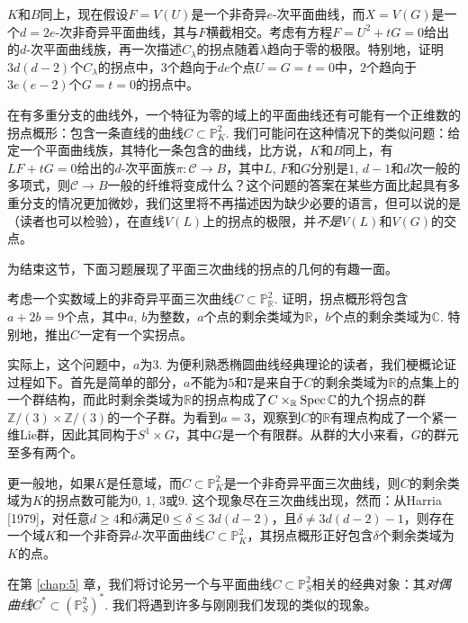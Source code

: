 \begin{exe}\label{exe:4.12}
	$K$和$B$同上，现在假设$F=V(U)$是一个非奇异$e$-次平面曲线，而$X=V(G)$是一个$d=2e$-次非奇异平面曲线，其与$F$横截相交。考虑有方程$F=U^2+tG=0$给出的$d$-次平面曲线族，再一次描述$C_\lambda$的拐点随着$\lambda$趋向于零的极限。特别地，证明$3d(d-2)$个$C_\lambda$的拐点中，$3$个趋向于$de$个点$U=G=t=0$中，$2$个趋向于$3e(e-2)$个$G=t=0$的拐点中。
\end{exe}

在有多重分支的曲线外，一个特征为零的域上的平面曲线还有可能有一个正维数的拐点概形：包含一条直线的曲线$C\subset \mathbb P_K^2$. 我们可能问在这种情况下的类似问题：给定一个平面曲线族，其特化一条包含的曲线，比方说，$K$和$B$同上，有$LF+tG=0$给出的$d$-次平面族$\pi:\mathscr C\to B$，其中$L$, $F$和$G$分别是$1$, $d-1$和$d$次一般的多项式，则$\mathscr C\to B$一般的纤维将变成什么？这个问题的答案在某些方面比起具有多重分支的情况更加微妙，我们这里将不再描述因为缺少必要的语言，但可以说的是（读者也可以检验），在直线$V(L)$上的拐点的极限，并\textit{不是}$V(L)$和$V(G)$的交点。

为结束这节，下面习题展现了平面三次曲线的拐点的几何的有趣一面。

\begin{exe}\label{exe:4.13}
	考虑一个实数域上的非奇异平面三次曲线$C\subset \mathbb P_{\mathbb R}^2$. 证明，拐点概形将包含$a+2b=9$个点，其中$a$, $b$为整数，$a$个点的剩余类域为$\mathbb R$，$b$个点的剩余类域为$\mathbb C$. 特别地，推出$C$一定有一个实拐点。
\end{exe}

实际上，这个问题中，$a$为$3$. 为便利熟悉椭圆曲线经典理论的读者，我们梗概论证过程如下。首先是简单的部分，$a$不能为$5$和$7$是来自于$C$的剩余类域为$\mathbb R$的点集上的一个群结构，而此时剩余类域为$\mathbb R$的拐点构成了$C\times_{\mathbb R}\operatorname{Spec} \mathbb C$的九个拐点的群$\mathbb Z/(3)\times \mathbb Z/(3)$的一个子群。为看到$a=3$，观察到$C$的$\mathbb R$有理点构成了一个紧一维Lie群，因此其同构于$S^1\times G$，其中$G$是一个有限群。从群的大小来看，$G$的群元至多有两个。

更一般地，如果$K$是任意域，而$C\subset \mathbb P_K^2$是一个非奇异平面三次曲线，则$C$的剩余类域为$K$的拐点数可能为$0$, $1$, $3$或$9$. 这个现象尽在三次曲线出现，然而：从Harria [1979]，对任意$d\geq 4$和$\delta$满足$0\leq \delta\leq 3d(d-2)$，且$\delta\neq 3d(d-2)-1$，则存在一个域$K$和一个非奇异$d$-次平面曲线$C\subset \mathbb P_K^2$，其拐点概形正好包含$\delta$个剩余类域为$K$的点。

在第 \ref{chap:5} 章，我们将讨论另一个与平面曲线$C\subset \mathbb P_S^2$相关的经典对象：其\textit{对偶曲线}$C^*\subset (\mathbb P_S^2)^*$. 我们将遇到许多与刚刚我们发现的类似的现象。